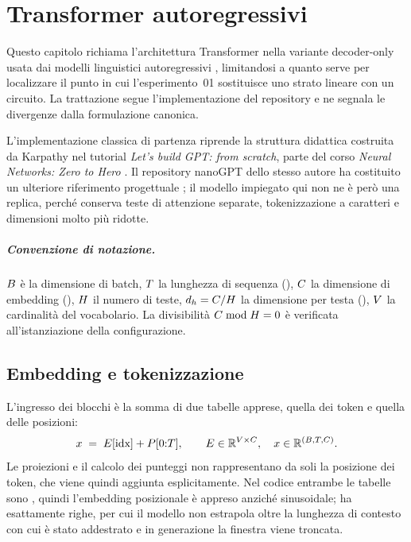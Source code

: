 \chapter{Transformer autoregressivi}
\label{cap:transformer}

Questo capitolo richiama l'architettura Transformer nella variante decoder-only
usata dai modelli linguistici autoregressivi \parencite{vaswani2017attention},
limitandosi a quanto serve per localizzare il punto in cui l'esperimento~01
sostituisce uno strato lineare con un circuito. La trattazione segue
l'implementazione del repository e ne segnala le divergenze dalla formulazione
canonica.

L'implementazione classica di partenza riprende la struttura didattica costruita
da Karpathy nel tutorial \emph{Let's build GPT: from scratch}, parte del corso
\emph{Neural Networks: Zero to Hero} \parencite{karpathyZeroToHero}. Il
repository nanoGPT dello stesso autore ha costituito un ulteriore riferimento
progettuale \parencite{karpathyNanoGPT}; il modello impiegato qui non ne è però
una replica, perché conserva teste di attenzione separate, tokenizzazione a
caratteri e dimensioni molto più ridotte.

\paragraph{Convenzione di notazione.} $B$ è la dimensione di batch, $T$
la lunghezza di sequenza (), $C$ la dimensione di embedding
(), $H$ il numero di teste, $d_h = C/H$ la
dimensione per testa (), $V$ la cardinalità del vocabolario.
La divisibilità $C \bmod H = 0$ è verificata all'istanziazione della
configurazione.

\section{Embedding e tokenizzazione}
\label{ssec:tokenizer}

L'ingresso dei blocchi è la somma di due tabelle apprese, quella dei token e
quella delle posizioni:
\begin{equation}
  x \;=\; E[\text{idx}] + P[0{:}T],
  \qquad E \in \mathbb{R}^{V \times C},\quad
  x \in \mathbb{R}^{(B, T, C)} .
  \label{eq:input-gpt}
\end{equation}
Le proiezioni e il calcolo dei punteggi non rappresentano da soli la posizione
dei token, che viene quindi aggiunta esplicitamente. Nel codice entrambe le
tabelle sono
, quindi l'embedding posizionale è appreso anziché sinusoidale;
ha esattamente  righe, per cui il modello non estrapola oltre la
lunghezza di contesto con cui è stato addestrato e in generazione la finestra
viene troncata.


